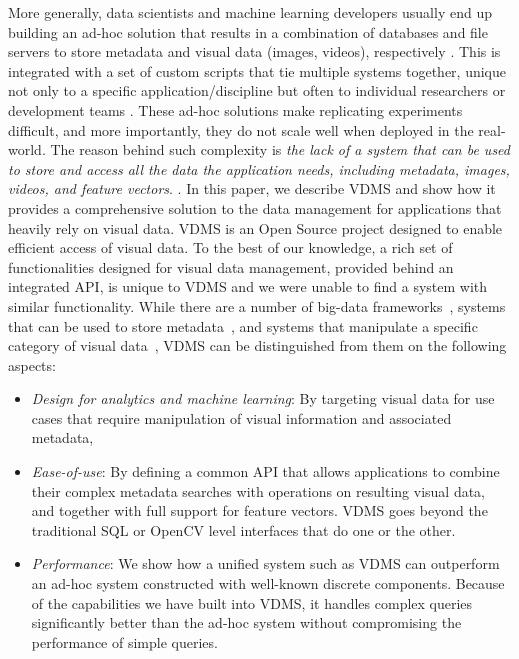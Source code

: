 More generally, data scientists and machine learning developers
usually end up building an ad-hoc solution that results in a
combination of databases and file servers to store
metadata and visual data (images, videos), respectively \cite{sculley2015hidden}.
This is integrated with a set of custom scripts that tie multiple systems together,
unique not only to a specific application/discipline but often
to individual researchers or development teams
\cite{mayer2020scalable, sculley2015hidden}.
These ad-hoc solutions make replicating experiments difficult,
and more importantly, they do not scale well when deployed in the real-world.
The reason behind such complexity is \textit{the lack of a system
that can be used to store and access all the data the application needs,
including metadata, images, videos, and feature vectors}.
.
In this paper, we describe VDMS and show how it provides a
comprehensive solution to the data management for applications
that heavily rely on visual data.
VDMS is an Open Source project designed to enable
efficient access of visual data.
To the best of our knowledge, a rich set of functionalities
designed for visual data management, provided behind an integrated API,
is unique to VDMS and we were unable to find a system with similar functionality.
While there are a number of big-data frameworks~\cite{spark, hadoop}, systems
that can be used to store metadata~\cite{memsql, vertica, mysql, postgresql},
and systems that manipulate a specific category of
visual data~\cite{scidb, rasdaman},
VDMS can be distinguished from them on the following aspects:

\begin{itemize}
\item {\em Design for analytics and machine learning}: By targeting
visual data for use cases that require manipulation
of visual information and associated metadata,
\item {\em Ease-of-use}: By defining a common API that allows applications to
combine their complex metadata searches with operations on resulting visual
data, and together with full support for feature vectors. VDMS goes beyond the
traditional SQL or OpenCV level interfaces that do one or the other.
\item {\em Performance}: We show how a unified system such as VDMS can
outperform an ad-hoc system constructed with well-known discrete components.
Because of the capabilities we have built into VDMS, it handles complex
queries significantly better than the ad-hoc system without compromising the
performance of simple queries.
\end{itemize}

